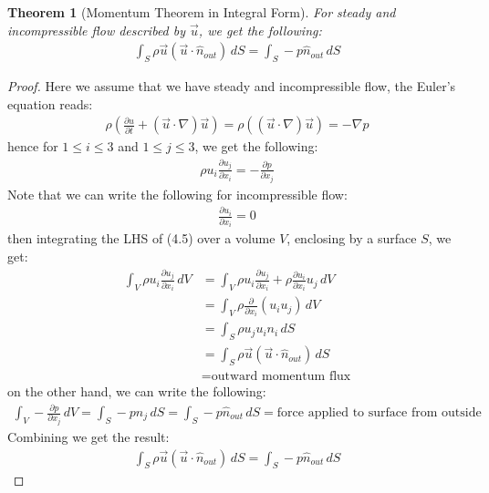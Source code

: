 \documentclass[11pt]{book}
\theoremstyle{break}
\theoremstyle{break}
\newtheorem{thm}{Theorem}[section]
\begin{document}
\begin{thm}[Momentum Theorem in Integral Form]
For steady and incompressible flow described by $\vec{u}$, we get the following:
\begin{align*}
\int_S \rho \vec{u}(\vec{u}\cdot \hat{n}_{out}) \, dS = \int_S -p \hat{n}_{out}\, dS
\end{align*}
\end{thm}
\begin{proof}
Here we assume that we have steady and incompressible flow, the Euler's equation reads:
\begin{align*}
\rho\left( \frac{\partial u}{\partial t} + \left( \vec{u}\cdot \nabla \right) \vec{u}\right) =\rho\left(\left( \vec{u}\cdot \nabla \right) \vec{u}\right) = -\nabla p
\end{align*}
hence for $1\leq i \leq 3$ and $1\leq j \leq 3$, we get the following:
\begin{align}
\rho u_i \frac{\partial u_j}{\partial x_i} = -\frac{\partial p}{\partial x_j}
\end{align}
Note that we can write the following for incompressible flow:
\begin{align*}
\frac{\partial u_i}{\partial x_i} = 0
\end{align*}
then integrating the LHS of (4.5) over a volume $V$, enclosing by a surface $S$, we get:
\begin{align*}
\int_V \rho u_i \frac{\partial u_j}{\partial x_i} \, dV
&=\int_V \rho u_i \frac{\partial u_j}{\partial x_i} + \rho \frac{\partial u_i}{\partial x_i} u_j\,dV \\
&= \int_V \rho \frac{\partial }{\partial x_i}(u_i u_j)\, dV \\
&= \int_S \rho u_j u_i n_i \, dS\\
&= \int_S \rho \vec{u}( \vec{u}\cdot \hat{n}_{out}) \, dS \\
&= \text{outward momentum flux}
\end{align*}
on the other hand, we can write the following:
\begin{align*}
\int_V - \frac{\partial p}{\partial x_j}\, dV = \int_S -p n_j \, dS = \int_S -p \hat{n}_{out}\, dS = \text{force applied to surface from outside}
\end{align*}
Combining we get the result:
\begin{align*}
\int_S \rho \vec{u}(\vec{u}\cdot \hat{n}_{out}) \, dS = \int_S -p \hat{n}_{out}\, dS
\end{align*}
\end{proof}
\end{document}
